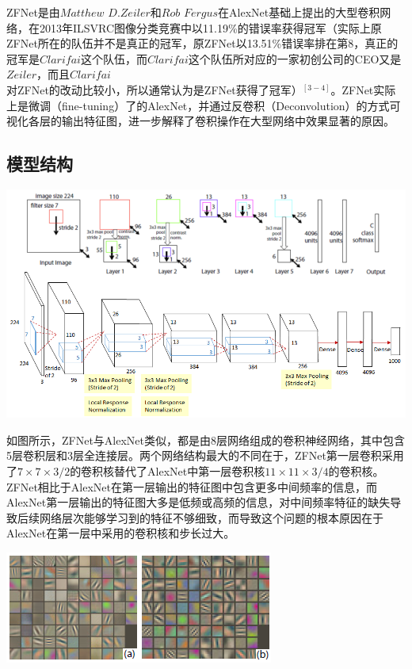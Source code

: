 \documentclass[12pt,a4paper,UTF8,twoside]{book}
\begin{document}
\hspace{0pt}ZFNet是由\(Matthew\) \(D. Zeiler\)和\(Rob\) \(Fergus\)在AlexNet基础上提出的大型卷积网络，在2013年ILSVRC图像分类竞赛中以11.19\%的错误率获得冠军（实际上原ZFNet所在的队伍并不是真正的冠军，原ZFNet以13.51\%错误率排在第8，真正的冠军是\(Clarifai\)这个队伍，而\(Clarifai\)这个队伍所对应的一家初创公司的CEO又是\(Zeiler\)，而且\(Clarifai\)对ZFNet的改动比较小，所以通常认为是ZFNet获得了冠军）\(^{[3-4]}\)。ZFNet实际上是微调（fine-tuning）了的AlexNet，并通过反卷积（Deconvolution）的方式可视化各层的输出特征图，进一步解释了卷积操作在大型网络中效果显著的原因。

\hypertarget{ux6a21ux578bux7ed3ux6784-2}{%
\subsection{模型结构}\label{ux6a21ux578bux7ed3ux6784-2}}

\begin{center}\includegraphics[width=0.7\linewidth]{img/02-04} \end{center}

\hspace{0pt}如图所示，ZFNet与AlexNet类似，都是由8层网络组成的卷积神经网络，其中包含5层卷积层和3层全连接层。两个网络结构最大的不同在于，ZFNet第一层卷积采用了\(7\times7\times3/2\)的卷积核替代了AlexNet中第一层卷积核\(11\times11\times3/4\)的卷积核。ZFNet相比于AlexNet在第一层输出的特征图中包含更多中间频率的信息，而AlexNet第一层输出的特征图大多是低频或高频的信息，对中间频率特征的缺失导致后续网络层次能够学习到的特征不够细致，而导致这个问题的根本原因在于AlexNet在第一层中采用的卷积核和步长过大。

\begin{center}\includegraphics[width=0.7\linewidth]{img/02-05} \end{center}
\end{document}
